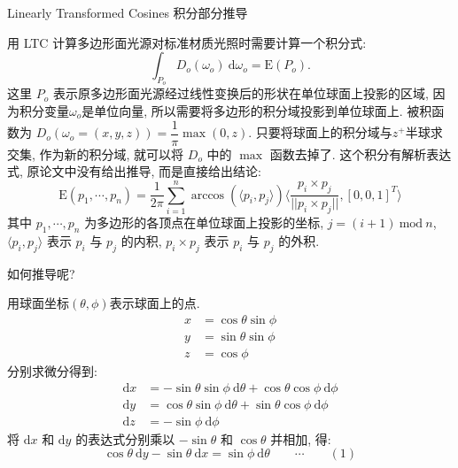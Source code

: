\newpage
\noindent Linearly Transformed Cosines 积分部分推导

用 LTC 计算多边形面光源对标准材质光照时需要计算一个积分式:
\[
\int_{P_o}{D_o(\omega_o)}\ \mathrm{d}\omega_o = \mathrm{E}(P_o) .
\]
这里 $P_o$ 表示原多边形面光源经过线性变换后的形状在单位球面上投影的区域, 因为积分变量$\omega_o$是单位向量, 所以需要将多边形的积分域投影到单位球面上. 被积函数为 $D_o(\omega_o = (x, y, z)) = \dfrac{1}{\pi}\max(0, z)$. 只要将球面上的积分域与$z^+$半球求交集, 作为新的积分域, 就可以将 $D_o$ 中的 $\max$ 函数去掉了. 这个积分有解析表达式, 原论文中没有给出推导, 而是直接给出结论:
\[
\mathrm{E}(p_1,\cdots,p_n) = \frac{1}{2\pi}\sum_{i=1}^{n}{\arccos( \langle p_i,p_j \rangle) \langle  \frac{p_i\times p_j}{||p_i\times p_j||}, [0,0,1]^T\rangle}
\]
其中 $p_1, \cdots, p_n$ 为多边形的各顶点在单位球面上投影的坐标, $j=(i+1)\ \mathrm{mod}\ n$, $\langle p_i, p_j \rangle$ 表示 $p_i$ 与 $p_j$ 的内积,  $p_i \times p_j$ 表示 $p_i$ 与 $p_j$ 的外积.

如何推导呢?

用球面坐标$(\theta,\phi)$表示球面上的点. 
\begin{align*}
x &= \cos\theta\sin\phi \\
y &= \sin\theta\sin\phi \\
z &= \cos\phi
\end{align*}
分别求微分得到:
\begin{align*}
\mathrm{d}x &= -\sin\theta\sin\phi\ \mathrm{d}\theta + \cos\theta\cos\phi\ \mathrm{d}\phi \\
\mathrm{d}y &= \cos\theta\sin\phi\ \mathrm{d}\theta + \sin\theta\cos\phi\ \mathrm{d}\phi\\
\mathrm{d}z &= -\sin\phi\ \mathrm{d}\phi
\end{align*}
将 $\mathrm{d}x$ 和 $\mathrm{d}y$ 的表达式分别乘以 $-\sin\theta$ 和 $\cos\theta$ 并相加, 得:
\[
\cos\theta\ \mathrm{d}y - \sin\theta\ \mathrm{d}x = \sin\phi\ \mathrm{d}\theta \qquad\cdots\qquad (1)
\]

